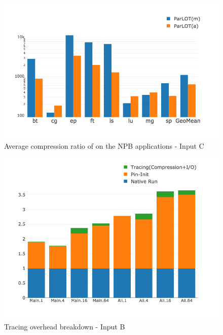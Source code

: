 \begin{figure}[t]
\centering
\includegraphics[width=.75\textwidth]{parlot/figs.comet.newMed/comet_chartAvg_cr_C_p3_5.png}
\caption{ Average compression ratio of \parlot on the NPB applications - Input C}
\label{comet_chartAvg_cr_C_p3_5}
\end{figure}







\begin{figure}[b]
\centering
\includegraphics[width=.75\textwidth]{parlot/figs.comet.newMed/comet_chartDet_B_wc_byTool_p3_5.png}
\caption{ Tracing overhead breakdown - Input B}
\label{comet_chartDet_B_wc_byTool_p3_5}
\end{figure}


